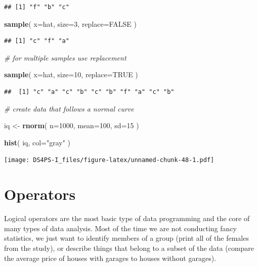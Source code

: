 \documentclass[]{book}
\newenvironment{Shaded}{\begin{snugshade}}{\end{snugshade}}
\newcommand{\CommentTok}[1]{\textcolor[rgb]{0.56,0.35,0.01}{\textit{#1}}}
\newcommand{\DataTypeTok}[1]{\textcolor[rgb]{0.13,0.29,0.53}{#1}}
\newcommand{\DecValTok}[1]{\textcolor[rgb]{0.00,0.00,0.81}{#1}}
\newcommand{\KeywordTok}[1]{\textcolor[rgb]{0.13,0.29,0.53}{\textbf{#1}}}
\newcommand{\NormalTok}[1]{#1}
\newcommand{\OtherTok}[1]{\textcolor[rgb]{0.56,0.35,0.01}{#1}}
\newcommand{\StringTok}[1]{\textcolor[rgb]{0.31,0.60,0.02}{#1}}
\theoremstyle{definition}
\theoremstyle{definition}
\theoremstyle{definition}
\theoremstyle{remark}
\begin{document}
\begin{verbatim}
## [1] "f" "b" "c"
\end{verbatim}

\begin{Shaded}
\begin{Highlighting}[]
\KeywordTok{sample}\NormalTok{( }\DataTypeTok{x=}\NormalTok{hat, }\DataTypeTok{size=}\DecValTok{3}\NormalTok{, }\DataTypeTok{replace=}\OtherTok{FALSE}\NormalTok{ )}
\end{Highlighting}
\end{Shaded}

\begin{verbatim}
## [1] "c" "f" "a"
\end{verbatim}

\begin{Shaded}
\begin{Highlighting}[]
\CommentTok{# for multiple samples use replacement}

\KeywordTok{sample}\NormalTok{( }\DataTypeTok{x=}\NormalTok{hat, }\DataTypeTok{size=}\DecValTok{10}\NormalTok{, }\DataTypeTok{replace=}\OtherTok{TRUE}\NormalTok{ )}
\end{Highlighting}
\end{Shaded}

\begin{verbatim}
##  [1] "c" "a" "c" "b" "c" "b" "f" "a" "c" "b"
\end{verbatim}

\begin{Shaded}
\begin{Highlighting}[]
\CommentTok{# create data that follows a normal curve}

\NormalTok{iq <-}\StringTok{ }\KeywordTok{rnorm}\NormalTok{( }\DataTypeTok{n=}\DecValTok{1000}\NormalTok{, }\DataTypeTok{mean=}\DecValTok{100}\NormalTok{, }\DataTypeTok{sd=}\DecValTok{15}\NormalTok{ )}

\KeywordTok{hist}\NormalTok{( iq, }\DataTypeTok{col=}\StringTok{"gray"}\NormalTok{ )}
\end{Highlighting}
\end{Shaded}

\texttt{[image: DS4PS-I\_files/figure-latex/unnamed-chunk-48-1.pdf]}

\hypertarget{operators}{%
\chapter{Operators}\label{operators}}

Logical operators are the most basic type of data programming and the
core of many types of data analysis. Most of the time we are not
conducting fancy statistics, we just want to identify members of a group
(print all of the females from the study), or describe things that
belong to a subset of the data (compare the average price of houses with
garages to houses without garages).
\end{document}
